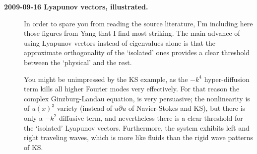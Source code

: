 \begin{description}
\item[\bf 2009-09-16 Lyapunov vectors, illustrated.]
In order to spare you from reading the source literature, I'm including here
those figures from Yang \etal{} that I find most striking.
The main advance of using Lyapunov vectors instead of eigenvalues alone
is that the approximate orthogonality of the `isolated' ones provides a clear
threshold between the `physical' and the rest.

You might be unimpressed by the KS example, as the $-k^4$ hyper-diffusion
term kills all higher Fourier modes very effectively. For that reason the
complex Ginzburg-Landau equation, 
is very persuasive; the nonlinearity is
of $u(x)^3$ variety (instead of $u \partial u$ of Navier-Stokes and
KS), but there is only a $-k^2$ diffusive term, and nevertheless there
is a clear threshold for the `isolated' Lyapunov vectors. Furthermore,
the system exhibits left and right traveling waves, which is more like
fluids than the rigid wave patterns of KS.


\end{description}
